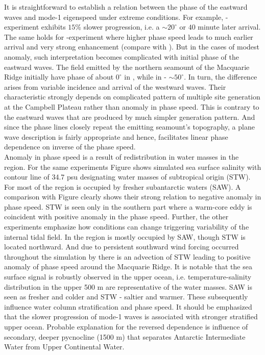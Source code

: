 \documentclass[12pt]{article}
\begin{document}
It is straightforward to establish a relation between the phase of the eastward waves and mode-1 
eigenspeed under extreme conditions. For example, -experiment exhibits $15\%$ slower 
progression, i.e. a $\sim 20^{\circ}$ or $40$ minute later arrival. The same holds for 
-experiment where higher phase speed leads to much earlier arrival and very strong 
enhancement (compare  with ). But in the cases of modest anomaly, such interpretation becomes complicated with initial 
phase of the eastward waves. The field emitted by the northern seamount of the 
Macquarie Ridge initially have phase of about $0^{\circ}$ in , while in  - 
$\sim 50^{\circ}$. In turn, the difference arises from variable incidence and arrival of the 
westward waves. Their characteristic strongly depends on complicated pattern of multiple site 
generation at the Campbell Plateau rather than anomaly in phase speed. This is contrary to the 
eastward waves that are produced by much simpler generation pattern. And since the phase lines 
closely repeat the emitting seamount's topography, a plane wave description is fairly appropriate 
and hence, facilitates linear phase dependence on inverse of the phase speed.\\

Anomaly in phase speed is a result of redistribution in water masses in the region. For the same 
experiments Figure shows simulated sea surface salinity with contour line of 34.7 psu designating 
water masses of subtropical origin (STW). For  most of the region is occupied by fresher 
subantarctic waters (SAW). A comparison with Figure clearly shows their strong relation to negative 
anomaly in phase speed. STW is seen only in the southern part where a warm-core eddy is 
coincident with positive anomaly in the phase speed. Further, the other experiments emphasize how 
conditions can 
change 
triggering variability of the internal tidal field. In  the region is mostly occupied 
by SAW, though STW is located northward. And due to persistent southward wind forcing occurred 
throughout the simulation by  there is an advection of STW leading to positive anomaly 
of phase speed around the 
Macquarie Ridge. It is 
notable that the sea surface signal is robustly observed in the upper ocean, i.e. 
temperature-salinity distribution in the upper 500 m are representative of the water masses. SAW is 
seen as fresher and colder and STW - saltier and warmer. 
These subsequently influence water column stratification and phase speed. It should be emphasized 
that the slower progression of mode-1 waves is associated with stronger stratified upper ocean. 
Probable explanation for the reversed dependence is influence of secondary, deeper pycnocline (1500 
m) that separates Antarctic Intermediate Water from Upper Continental Water.
\end{document}
